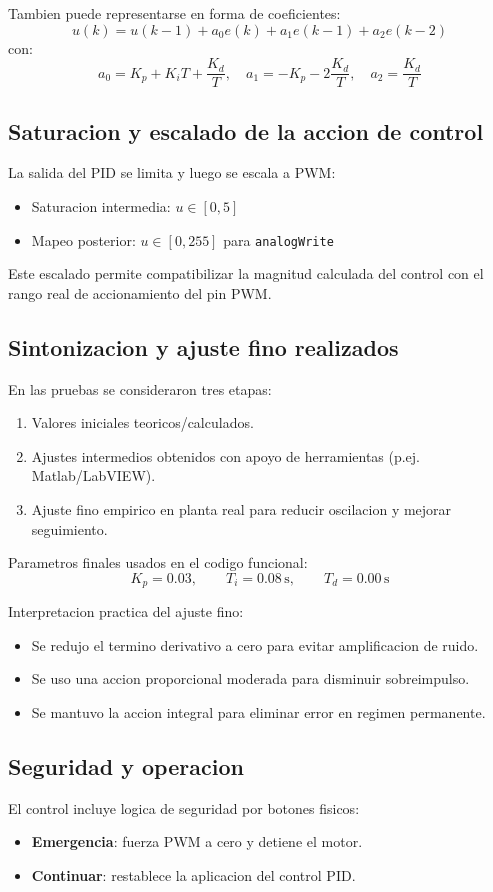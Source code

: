 \documentclass[journal, onecolumn]{IEEEtran}
\begin{document}
Tambien puede representarse en forma de coeficientes:
\[
 u(k)=u(k-1)+a_0 e(k)+a_1 e(k-1)+a_2 e(k-2)
\]
con:
\[
 a_0=K_p+K_iT+\frac{K_d}{T},\quad
 a_1=-K_p-2\frac{K_d}{T},\quad
 a_2=\frac{K_d}{T}
\]

\subsection{Saturacion y escalado de la accion de control}
La salida del PID se limita y luego se escala a PWM:
\begin{itemize}
  \item Saturacion intermedia: $u\in[0,5]$
  \item Mapeo posterior: $u\in[0,255]$ para \texttt{analogWrite}
\end{itemize}

Este escalado permite compatibilizar la magnitud calculada del control con el rango real de
accionamiento del pin PWM.

\subsection{Sintonizacion y ajuste fino realizados}
En las pruebas se consideraron tres etapas:
\begin{enumerate}
  \item Valores iniciales teoricos/calculados.
  \item Ajustes intermedios obtenidos con apoyo de herramientas (p.ej. Matlab/LabVIEW).
  \item Ajuste fino empirico en planta real para reducir oscilacion y mejorar seguimiento.
\end{enumerate}

Parametros finales usados en el codigo funcional:
\[
K_p=0.03,\qquad T_i=0.08\,\mathrm{s},\qquad T_d=0.00\,\mathrm{s}
\]

Interpretacion practica del ajuste fino:
\begin{itemize}
  \item Se redujo el termino derivativo a cero para evitar amplificacion de ruido.
  \item Se uso una accion proporcional moderada para disminuir sobreimpulso.
  \item Se mantuvo la accion integral para eliminar error en regimen permanente.
\end{itemize}

\subsection{Seguridad y operacion}
El control incluye logica de seguridad por botones fisicos:
\begin{itemize}
  \item \textbf{Emergencia}: fuerza PWM a cero y detiene el motor.
  \item \textbf{Continuar}: restablece la aplicacion del control PID.
\end{itemize}
\end{document}
